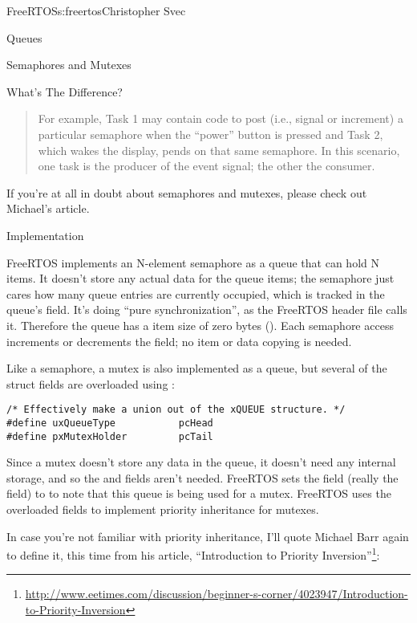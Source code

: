 \begin{aosachapter}{FreeRTOS}{s:freertos}{Christopher Svec}
\begin{aosasect1}{Queues}
\begin{aosasect2}{Semaphores and Mutexes}
\begin{aosasect3}{What's The Difference?}
\begin{quotation}
\noindent For example, Task 1 may contain code to post (i.e., signal or increment) a 
particular semaphore when the ``power'' button is pressed and Task 2, which wakes the 
display, pends on that same semaphore. In this scenario, one task is the producer of 
the event signal; the other the consumer.
\end{quotation}

\noindent If you're at all in doubt about semaphores and mutexes, please check
out Michael's article.

\end{aosasect3}

\begin{aosasect3}{Implementation}

FreeRTOS implements an N-element semaphore as a queue that can hold N
items. It doesn't store any actual data for the queue items; the
semaphore just cares how many queue entries are currently occupied,
which is tracked in the queue's  field.  It's
doing ``pure synchronization'', as the FreeRTOS header file
 calls it.  Therefore the queue has a item size of zero
bytes ().  Each semaphore access increments or
decrements the  field; no item or data copying
is needed.

Like a semaphore, a mutex is also implemented as a queue, but several
of the  struct fields are overloaded using
:

\begin{verbatim}
/* Effectively make a union out of the xQUEUE structure. */
#define uxQueueType           pcHead
#define pxMutexHolder         pcTail
\end{verbatim}

Since a mutex doesn't store any data in the queue, it doesn't need any
internal storage, and so the  and  fields
aren't needed.  FreeRTOS sets the  field (really the
 field) to  to note that this queue is being used for a
mutex.  FreeRTOS uses the overloaded  fields to implement
priority inheritance for mutexes.

In case you're not familiar with priority inheritance, I'll quote
Michael Barr again to define it, this time from his article,
``Introduction to Priority
Inversion''\footnote{\url{http://www.eetimes.com/discussion/beginner-s-corner/4023947/Introduction-to-Priority-Inversion}}:


\end{aosasect3}
\end{aosasect2}
\end{aosasect1}
\end{aosachapter}

